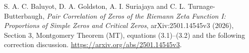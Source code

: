 S. A. C. Baluyot, D. A. Goldston, A. I. Suriajaya and
C. L. Turnage-Butterbaugh,
\emph{Pair Correlation of Zeros of the Riemann Zeta Function I:
Proportions of Simple Zeros and Critical Zeros},
arXiv:2501.14545v3 (2026), Section 3, Montgomery Theorem (MT),
equations (3.1)--(3.2) and the following correction discussion.
\url{https://arxiv.org/abs/2501.14545v3}.
